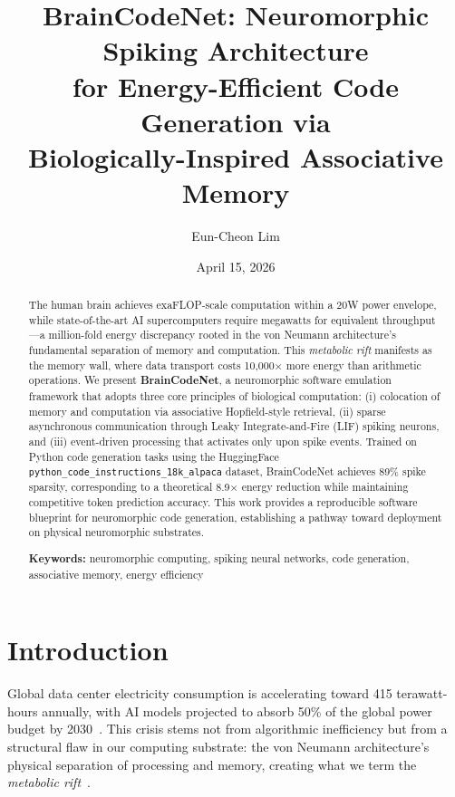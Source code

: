 \documentclass[11pt,a4paper]{article}
\title{
    \textbf{BrainCodeNet: Neuromorphic Spiking Architecture\\
    for Energy-Efficient Code Generation via\\
    Biologically-Inspired Associative Memory}
}
\author[1]{Eun-Cheon Lim}
\affil[1]{AI Research and Development}
\date{April 15, 2026}
\begin{document}
\maketitle

\begin{abstract}
\noindent
The human brain achieves exaFLOP-scale computation within a 20W power envelope, while state-of-the-art AI supercomputers require megawatts for equivalent throughput—a million-fold energy discrepancy rooted in the von Neumann architecture's fundamental separation of memory and computation. This \emph{metabolic rift} manifests as the memory wall, where data transport costs 10,000× more energy than arithmetic operations. We present \textbf{BrainCodeNet}, a neuromorphic software emulation framework that adopts three core principles of biological computation: (i) colocation of memory and computation via associative Hopfield-style retrieval, (ii) sparse asynchronous communication through Leaky Integrate-and-Fire (LIF) spiking neurons, and (iii) event-driven processing that activates only upon spike events. Trained on Python code generation tasks using the HuggingFace \texttt{python\_code\_instructions\_18k\_alpaca} dataset, BrainCodeNet achieves 89\% spike sparsity, corresponding to a theoretical 8.9× energy reduction while maintaining competitive token prediction accuracy. This work provides a reproducible software blueprint for neuromorphic code generation, establishing a pathway toward deployment on physical neuromorphic substrates.

\medskip
\noindent\textbf{Keywords:} neuromorphic computing, spiking neural networks, code generation, associative memory, energy efficiency
\end{abstract}

\section{Introduction}

Global data center electricity consumption is accelerating toward 415 terawatt-hours annually, with AI models projected to absorb 50\% of the global power budget by 2030~\citep{strubell2019energy}. This crisis stems not from algorithmic inefficiency but from a structural flaw in our computing substrate: the von Neumann architecture's physical separation of processing and memory, creating what we term the \emph{metabolic rift}~\citep{koomey2011web}.
\end{document}
